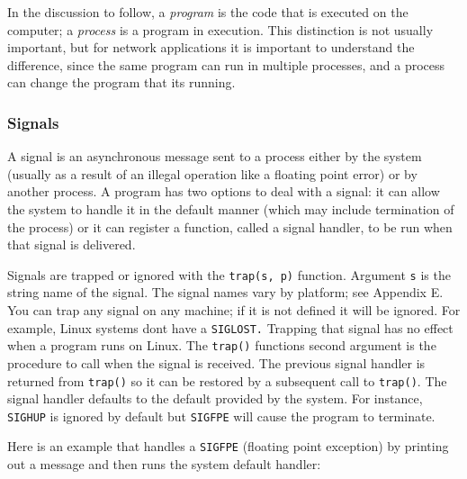 In the discussion to follow, a \textit{program} is the code that is
executed on the computer; a \textit{process}\textit{ }is
a program in execution. This distinction is not usually important, but
for network applications it is important to understand the difference,
since the same program can run in multiple processes, and a process can
change the program that it{\textquotesingle}s running.

\subsubsection{Signals}

A signal is an asynchronous message sent to a process
either by the system (usually as a result of an illegal operation like
a floating point error) or by another
process. A program has two options to deal with a signal: it can allow
the system to handle it in the default manner (which may include
termination of the process) or it can register a function, called a
signal handler, to be run when that signal is delivered.

Signals are trapped or ignored with the \texttt{trap(s, p)} function.
Argument \texttt{s} is the string name of the signal. The signal names
vary by platform; see Appendix E. You can trap any signal on any
machine; if it is not defined it will be ignored. For example, Linux
systems don{\textquotesingle}t have a \texttt{SIGLOST.} Trapping that
signal has no effect when a program runs on Linux. The \texttt{trap()}
function{\textquotesingle}s second argument is the procedure to call
when the signal is received. The previous signal handler is returned
from \texttt{trap()} so it can be restored by a
subsequent call to \texttt{trap()}. The signal handler defaults to the
default provided by the system. For instance, \texttt{SIGHUP} is
ignored by default but \texttt{SIGFPE} will cause the program to
terminate.

Here is an example that handles a \texttt{SIGFPE} (floating point
exception) by printing out a message and then runs the system default
handler:


